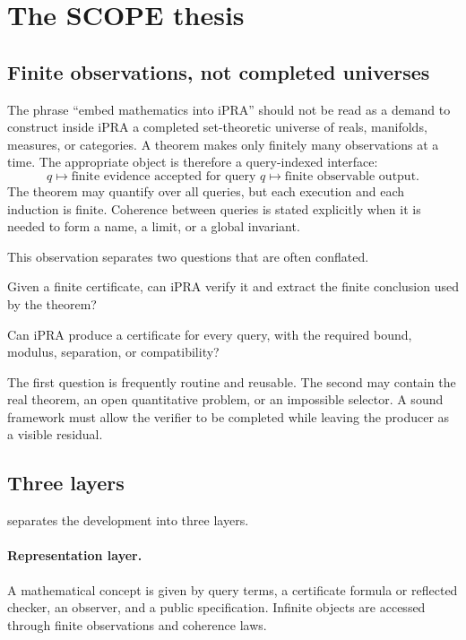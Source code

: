 \section{The SCOPE thesis}
\label{sec:thesis}

\subsection{Finite observations, not completed universes}

The phrase ``embed mathematics into iPRA'' should not be read as a demand to
construct inside iPRA a completed set-theoretic universe of reals, manifolds,
measures, or categories.  A theorem makes only finitely many observations at a
time.  The appropriate object is therefore a query-indexed interface:
\[
  q \longmapsto \text{finite evidence accepted for query }q
       \longmapsto \text{finite observable output}.
\]
The theorem may quantify over all queries, but each execution and each
induction is finite.  Coherence between queries is stated explicitly when it
is needed to form a name, a limit, or a global invariant.

This observation separates two questions that are often conflated.

\begin{description}[leftmargin=2.9cm]
\item[Local verification.]  Given a finite certificate, can iPRA verify it and
  extract the finite conclusion used by the theorem?
\item[Global production.]  Can iPRA produce a certificate for every query, with
  the required bound, modulus, separation, or compatibility?
\end{description}

The first question is frequently routine and reusable.  The second may contain
the real theorem, an open quantitative problem, or an impossible selector.  A
sound framework must allow the verifier to be completed while leaving the
producer as a visible residual.

\subsection{Three layers}

\Scope separates the development into three layers.

\paragraph{Representation layer.}
A mathematical concept is given by query terms, a certificate formula or
reflected checker, an observer, and a public specification.  Infinite objects
are accessed through finite observations and coherence laws.

